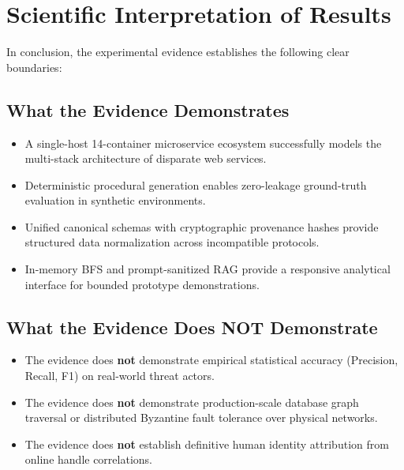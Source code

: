 \section{Scientific Interpretation of Results}
\label{sec:eval-interpretation}
In conclusion, the experimental evidence establishes the following clear boundaries:

\subsection{What the Evidence Demonstrates}
\begin{itemize}
    \item A single-host 14-container microservice ecosystem successfully models the multi-stack architecture of disparate web services.
    \item Deterministic procedural generation enables zero-leakage ground-truth evaluation in synthetic environments.
    \item Unified canonical schemas with cryptographic provenance hashes provide structured data normalization across incompatible protocols.
    \item In-memory BFS and prompt-sanitized RAG provide a responsive analytical interface for bounded prototype demonstrations.
\end{itemize}

\subsection{What the Evidence Does NOT Demonstrate}
\begin{itemize}
    \item The evidence does \textbf{not} demonstrate empirical statistical accuracy (Precision, Recall, F1) on real-world threat actors.
    \item The evidence does \textbf{not} demonstrate production-scale database graph traversal or distributed Byzantine fault tolerance over physical networks.
    \item The evidence does \textbf{not} establish definitive human identity attribution from online handle correlations.
\end{itemize}
